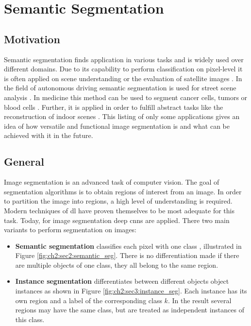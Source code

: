 
\section{Semantic Segmentation}\label{ord:ch2:sec2}

\subsection{Motivation}\label{ord:ch2:sec2:subsec_motivation}
Semantic segmentation finds application in various tasks and is widely used over different domains.
Due to its capability to perform classification on pixel-level it is often applied on scene understanding \cite{LiJ09-SceneUnderstanding} or the evaluation of satellite images \cite{Li18-SateliteImagery}.
In the field of autonomous driving semantic segmentation is used for street scene analysis \cite{Cor16-Cityscapes} \cite{Men15-AutonVehicles} \cite{Neu17-MapillaryDataset}.
In medicine this method can be used to segment cancer cells, tumors \cite{RF15-U-Net} or blood cells \cite{Tran19-BloodCell}.
Further, it is applied in order to fulfill abstract tasks like the reconstruction of indoor scenes \cite{Dai17-ReconstructionIndoorScenes}.
This listing of only some applications gives an idea of how versatile and functional image segmentation is and what can be achieved with it in the future.


\subsection{General}\label{ord:ch2:sec2:subsec_general}
Image segmentation is an advanced task of computer vision.
The goal of segmentation algorithms is to obtain regions of interest from an image.
In order to partition the image into regions, a high level of understanding is required.
Modern techniques of \gls{dl} have proven themselves to be most adequate for this task.
Today, for image segmentation deep \glspl{cnn} are applied.
There two main variants to perform segmentation on images:
\begin{itemize}
	\item \textbf{Semantic segmentation} classifies each pixel with one class \cite{RF15-U-Net} \cite{Zhao17-PSP}, illustrated in Figure \ref{fig:ch2:sec2:semantic_seg}.
	There is no differentiation made if there are multiple objects of one class, they all belong to the same region.
	\item \textbf{Instance segmentation} differentiates between different objects object instances \cite{DHS16-MNC} \cite{He17-MaskR-CNN} as shown in Figure \ref{fig:ch2:sec3:instance_seg}.
	Each instance has its own region and a label of the corresponding class $k$.
	In the result several regions may have the same class, but are treated as independent instances of this class.
\end{itemize}

